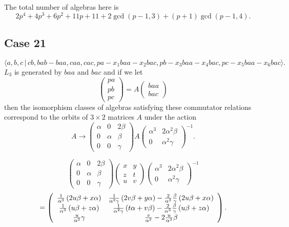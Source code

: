 \documentclass[10pt,thmsa]{article}
\begin{document}
The total number of algebras here is 
\[
2p^{4}+4p^{3}+6p^{2}+11p+11+2\gcd (p-1,3)+(p+1)\gcd (p-1,4). 
\]

\subsection{Case 21}

\[
\langle
a,b,c\,|%
\,cb,bab-baa,caa,cac,pa-x_{1}baa-x_{2}bac,pb-x_{3}baa-x_{4}bac,pc-x_{5}baa-x_{6}bac\rangle . 
\]%
$L_{3}$ is generated by $baa$ and $bac$ and if we let 
\[
\left( 
\begin{array}{l}
pa \\ 
pb \\ 
pc%
\end{array}%
\right) =A\left( 
\begin{array}{l}
baa \\ 
bac%
\end{array}%
\right) 
\]%
then the isomorphism classes of algebras satisfying these commutator
relations correspond to the orbits of $3\times 2$ matrices $A$ under the
action 
\[
A\rightarrow \left( 
\begin{array}{lll}
\alpha & 0 & 2\beta \\ 
0 & \alpha & \beta \\ 
0 & 0 & \gamma%
\end{array}%
\right) A\left( 
\begin{array}{ll}
\alpha ^{3} & 2\alpha ^{2}\beta \\ 
0 & \alpha ^{2}\gamma%
\end{array}%
\right) ^{-1}. 
\]

\[
\left( 
\begin{array}{lll}
\alpha & 0 & 2\beta \\ 
0 & \alpha & \beta \\ 
0 & 0 & \gamma%
\end{array}%
\right) \left( 
\begin{array}{ll}
x & y \\ 
z & t \\ 
u & v%
\end{array}%
\right) \left( 
\begin{array}{ll}
\alpha ^{3} & 2\alpha ^{2}\beta \\ 
0 & \alpha ^{2}\gamma%
\end{array}%
\right) ^{-1} 
\]
\[
=\left( 
\begin{array}{cc}
\frac{1}{\alpha ^{3}}\left( 2u\beta +x\alpha \right) & \frac{1}{\alpha
^{2}\gamma }\left( 2v\beta +y\alpha \right) -\frac{2}{\alpha ^{3}}\frac{%
\beta }{\gamma }\left( 2u\beta +x\alpha \right) \\ 
\frac{1}{\alpha ^{3}}\left( u\beta +z\alpha \right) & \frac{1}{\alpha
^{2}\gamma }\left( t\alpha +v\beta \right) -\frac{2}{\alpha ^{3}}\frac{\beta 
}{\gamma }\left( u\beta +z\alpha \right) \\ 
\frac{u}{\alpha ^{3}}\gamma & \frac{v}{\alpha ^{2}}-2\frac{u}{\alpha ^{3}}%
\beta%
\end{array}%
\right) . 
\]%
$\allowbreak $
\end{document}
